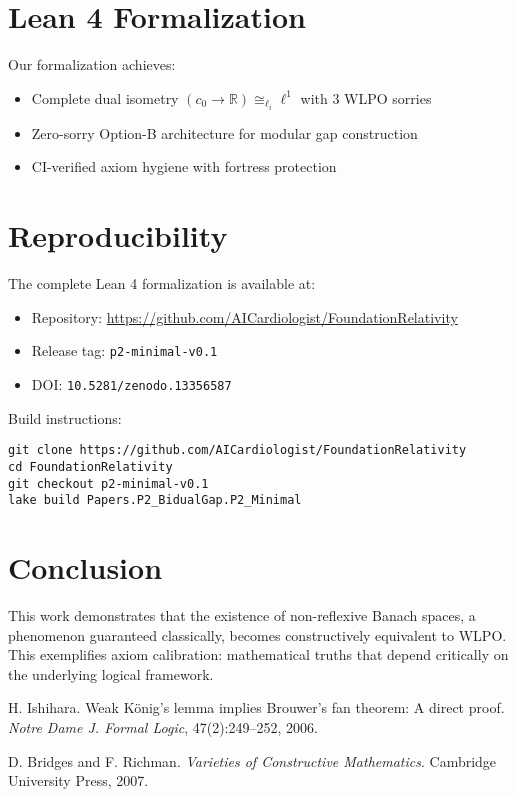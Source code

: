 \documentclass{article}
\begin{document}
\section{Lean 4 Formalization}

Our formalization achieves:
\begin{itemize}
\item Complete dual isometry $(c_0 \to \mathbb{R}) \cong_{\ell_i} \ell^1$ with 3 WLPO sorries
\item Zero-sorry Option-B architecture for modular gap construction
\item CI-verified axiom hygiene with fortress protection
\end{itemize}

\section{Reproducibility}

The complete Lean 4 formalization is available at:
\begin{itemize}
\item Repository: \url{https://github.com/AICardiologist/FoundationRelativity}
\item Release tag: \texttt{p2-minimal-v0.1}
\item DOI: \texttt{10.5281/zenodo.13356587}
\end{itemize}

Build instructions:
\begin{verbatim}
git clone https://github.com/AICardiologist/FoundationRelativity
cd FoundationRelativity
git checkout p2-minimal-v0.1
lake build Papers.P2_BidualGap.P2_Minimal
\end{verbatim}

\section{Conclusion}

This work demonstrates that the existence of non-reflexive Banach spaces, a phenomenon guaranteed classically, becomes constructively equivalent to WLPO. This exemplifies axiom calibration: mathematical truths that depend critically on the underlying logical framework.


\begin{thebibliography}{1}

H. Ishihara. Weak K\"{o}nig's lemma implies Brouwer's fan theorem: A direct proof. \textit{Notre Dame J. Formal Logic}, 47(2):249--252, 2006.

D. Bridges and F. Richman. \textit{Varieties of Constructive Mathematics}. Cambridge University Press, 2007.

\end{thebibliography}
\end{document}
